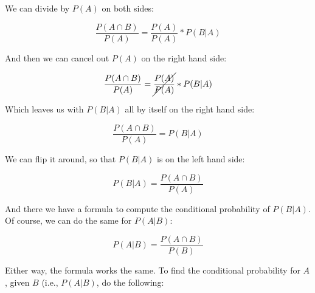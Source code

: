 \documentclass[../../../main.tex]{subfiles}
\begin{document}
\noindent
We can divide by $P(A)$ on both sides:

\begin{equation*}
  \frac{P(A \cap B)}{P(A)} = \frac{P(A)}{P(A)} * P(B | A)
\end{equation*}

\noindent
And then we can cancel out $P(A)$ on the right hand side:

\begin{equation*}
  \frac{P(A \cap B)}{P(A)} = \cancel{\frac{P(A)}{P(A)}} * P(B | A)
\end{equation*}

\noindent
Which leaves us with $P(B | A)$ all by itself on the right hand side:

\begin{equation*}
  \frac{P(A \cap B)}{P(A)} = P(B | A)
\end{equation*}

\noindent
We can flip it around, so that $P(B | A)$ is on the left hand side:

\begin{equation*}
  P(B | A) = \frac{P(A \cap B)}{P(A)}
\end{equation*}

\noindent
And there we have a formula to compute the conditional probability of $P(B | A)$. Of course, we can do the same for $P(A |B)$:

\begin{equation*}
  P(A | B) = \frac{P(A \cap B)}{P(B)}
\end{equation*}

\noindent
Either way, the formula works the same. To find the conditional probability for $A$, given $B$ (i.e., $P(A | B)$, do the following:
\end{document}
